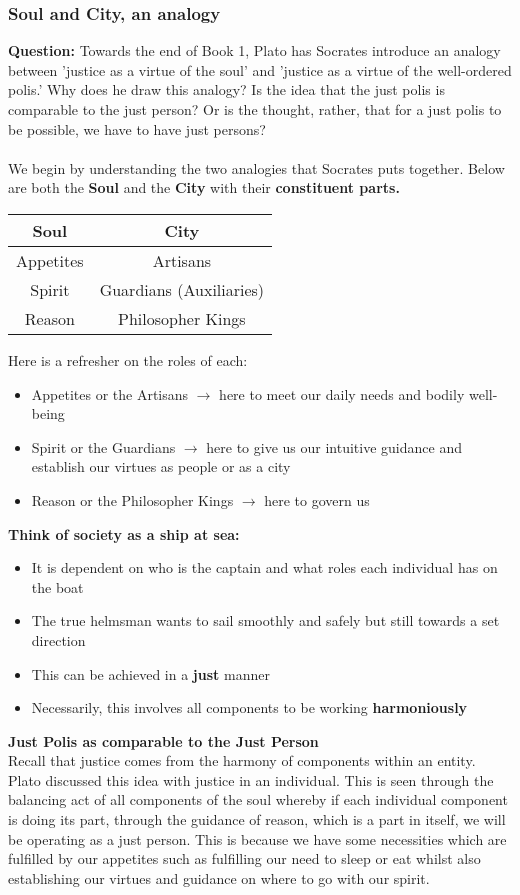 \documentclass[12pt, letterpaper]{article}
\begin{document}
\subsubsection{Soul and City, an analogy}
\textbf{Question:} Towards the end of Book 1, Plato has Socrates introduce an analogy between 'justice as a virtue of the soul' and 'justice as a virtue of the well-ordered polis.' Why does he draw this analogy? Is the idea that the just polis is comparable to the just person? Or is the thought, rather, that for a just polis to be possible, we have to have just persons?\\\\
We begin by understanding the two analogies that Socrates puts together. Below are both the \textbf{Soul} and the \textbf{City} with their \textbf{constituent parts.}
\begin{center}
	\begin{tabular}{c|c}
		\textbf{Soul} & \textbf{City}\\
		\hline
		Appetites & Artisans\\
		\hline
		Spirit & Guardians (Auxiliaries)\\
		\hline
		Reason & Philosopher Kings\\
		\hline
	\end{tabular}
\end{center}
Here is a refresher on the roles of each:
\begin{itemize}
	\item Appetites or the Artisans $\rightarrow$ here to meet our daily needs and bodily well-being
	\item Spirit or the Guardians $\rightarrow$ here to give us our intuitive guidance and establish our virtues as people or as a city
	\item Reason or the Philosopher Kings $\rightarrow$ here to govern us
\end{itemize}
\textbf{Think of society as a ship at sea:}
\begin{itemize}
	\item It is dependent on who is the captain and what roles each individual has on the boat
	\item The true helmsman wants to sail smoothly and safely but still towards a set direction
	\item This can be achieved in a \textbf{just} manner
	\item Necessarily, this involves all components to be working \textbf{harmoniously}
\end{itemize}
\textbf{Just Polis as comparable to the Just Person}\\
Recall that justice comes from the harmony of components within an entity. Plato discussed this idea with justice in an individual. This is seen through the balancing act of all components of the soul whereby if each individual component is doing its part, through the guidance of reason, which is a part in itself, we will be operating as a just person. This is because we have some necessities which are fulfilled by our appetites such as fulfilling our need to sleep or eat whilst also establishing our virtues and guidance on where to go with our spirit.
\end{document}
